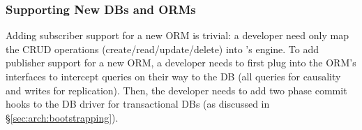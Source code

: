 \setlength{\tabcolsep}{3pt}
\begin{table}[t]
 \vspace{-0.3cm}
 \caption{{\small {\bf Support for Various DBs.}
 Shows ORM- and DB-specific lines of code (LoC) to support varied DBs.
 For ORMs supporting many DBs (e.g., ActiveRecord), adding a new DB comes for free.}}
 \label{tab:db-heterogeneity}
\end{table}
\setlength{\tabcolsep}{5pt}

\subsubsection{Supporting New DBs and ORMs}
Adding subscriber support for a new ORM is trivial: a developer need only map the CRUD operations (create/read/update/delete) into \synapse's engine.
To add publisher support for a new ORM, a developer needs to first plug into the ORM's interfaces to intercept queries on their way to the DB (all queries for causality and writes for replication).
Then, the developer needs to add two phase commit hooks to the DB driver for transactional DBs (as discussed in \S\ref{sec:arch:bootstrapping}).

